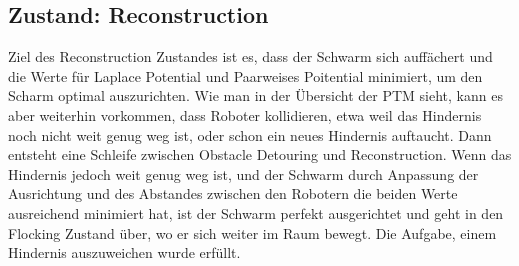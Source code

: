 \subsection{Zustand: Reconstruction}

Ziel des Reconstruction Zustandes ist es, dass der Schwarm sich auffächert und die Werte für Laplace
Potential und Paarweises Poitential minimiert, um den Scharm optimal auszurichten.
Wie man in der Übersicht der PTM sieht, kann es aber weiterhin vorkommen, dass Roboter kollidieren, etwa weil
das Hindernis noch nicht weit genug weg ist, oder schon ein neues Hindernis auftaucht. Dann entsteht eine
Schleife zwischen Obstacle Detouring und Reconstruction. Wenn das Hindernis jedoch weit genug weg ist, und
der Schwarm durch Anpassung der Ausrichtung und des Abstandes zwischen den Robotern die beiden Werte 
ausreichend minimiert hat, ist der Schwarm perfekt ausgerichtet und geht in den Flocking Zustand über, wo 
er sich weiter im Raum bewegt. Die Aufgabe, einem Hindernis auszuweichen wurde erfüllt.